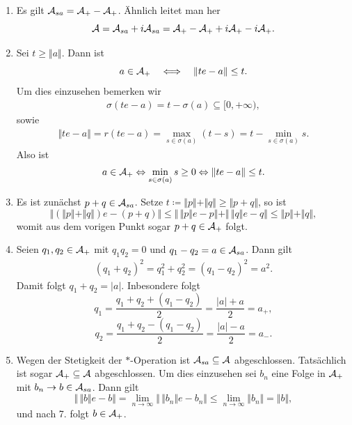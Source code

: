\begin{remark}
\begin{enumerate}
        Außerdem gilt $\iota_{\sigma(a)}^2 = \vert \iota_{\sigma(a)} \vert^2$, damit $\vert a \vert^2 = a^2$ und insbesondere $\vert a \vert = \sqrt{a^2}$.

        \item Es gilt $\mathcal{A}_{sa} = \mathcal{A}_+ - \mathcal{A}_+$. Ähnlich leitet man her
        $$ \mathcal{A} = \mathcal{A}_{sa} + i \mathcal{A}_{sa} = \mathcal{A}_+ - \mathcal{A}_+ + i \mathcal{A}_+ - i \mathcal{A}_+. $$

        \item Sei $t \geq \Vert a \Vert$. Dann ist
        $$ a \in \mathcal{A}_+ \quad\Longleftrightarrow\quad \Vert te - a \Vert \leq t. $$
        Um dies einzusehen bemerken wir
        \begin{align*}
            \sigma(te - a) = t - \sigma(a) \subseteq [0, +\infty),
        \end{align*}
        sowie
        \begin{align*}
            \Vert te - a \Vert = r(te - a) = \max_{s \in \sigma(a)} (t-s) = t - \min_{s \in \sigma(a)} s.
        \end{align*}
        Also ist
        \begin{align*}
            a \in \mathcal{A}_+ \Leftrightarrow \min_{s \in \sigma(a)} s \geq 0 \Leftrightarrow \Vert te - a \Vert \leq t.
        \end{align*}

        \item Es ist zunächst $p + q \in \mathcal{A}_{sa}$. Setze $t \coloneqq \Vert p \Vert + \Vert q \Vert \geq \Vert p+q \Vert$, so ist
        $$ \Vert (\Vert p \Vert + \Vert q \Vert) e - (p+q) \Vert \leq \Vert\, \Vert p \Vert e - p \Vert + \Vert \, \Vert q \Vert e - q \Vert \leq \Vert p \Vert + \Vert q \Vert, $$
        womit aus dem vorigen Punkt sogar $p+q \in \mathcal{A}_+$ folgt.

        \item Seien $q_1, q_2 \in \mathcal{A}_+$ mit $q_1 q_2 = 0$ und $q_1 - q_2 = a \in \mathcal{A}_{sa}$. Dann gilt
        \begin{align*}
            (q_1 + q_2)^2 = q_1^2 + q_2^2 = (q_1 - q_2)^2 = a^2.
        \end{align*}
        Damit folgt $q_1 + q_2 = \vert a \vert$. Inbesondere folgt
        $$ q_1 = \frac{q_1 + q_2 + (q_1 - q_2)}{2} = \frac{\vert a \vert + a}{2} = a_+, $$
        $$ q_2 = \frac{q_1 + q_2 - (q_1 - q_2)}{2} = \frac{\vert a \vert - a}{2} = a_-. $$

        \item Wegen der Stetigkeit der $\ast$-Operation ist $\mathcal{A}_{sa} \subseteq \mathcal{A}$ abgeschlossen. Tatsächlich ist sogar $\mathcal{A}_+ \subseteq \mathcal{A}$ abgeschlossen. Um dies einzusehen sei $b_n$ eine Folge in $\mathcal{A}_+$ mit $b_n \to b \in \mathcal{A}_{sa}$. Dann gilt
        $$ \Vert \, \Vert b \Vert e - b \Vert = \lim_{n \to \infty} \Vert \, \Vert b_n \Vert e - b_n \Vert \leq \lim_{n \to \infty} \Vert b_n \Vert = \Vert b \Vert, $$
        und nach 7. folgt $b \in \mathcal{A}_+$.
    \end{enumerate}
\end{remark}

